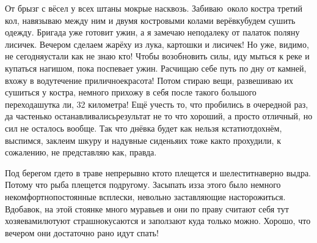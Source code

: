 От брызг с вёсел у всех штаны мокрые насквозь. Забиваю~около костра третий кол, навязываю между ним и двумя костровыми колами верёвку\mdash будем сушить одежду. Бригада уже готовит ужин, а я замечаю неподалеку от палаток поляну лисичек. Вечером сделаем жарёху из лука, картошки и лисичек! Но уже, видимо, не сегодня\mdash устали как не знаю кто! Чтобы возобновить силы, иду мыться к реке и купаться нагишом, пока поспевает ужин. Расчищаю себе путь по дну от камней, вхожу в воду\mdash течение приличное\mdash красота! Потом стираю вещи, развешиваю их сушиться у костра, немного прихожу в себя после такого большого перехода\mdash шутка ли, 32 километра! Ещё учесть то, что пробились в очередной раз, да частенько останавливались\mdash результат не то что хороший, а просто отличный, но сил не осталось вообще. Так что днёвка будет как нельзя кстати\mdash отдохнём, выспимся, заклеим шкуру и надувные сиденья\mdash их тоже как\sdash то прохудили, к сожалению, не представляю как, правда. 

Под берегом где\sdash то в траве непрерывно кто\sdash то плещется и шелестит\mdash наверно выдра. Потому что рыба плещется по\sdash другому. Засыпать из\sdash за этого было немного некомфортно\mdash постоянные всплески, невольно заставляющие насторожиться. Вдобавок, на этой стоянке много муравьев и они по праву считают себя тут хозяевами\mdash лютуют страшно\mdash кусаются и заползают куда только можно. Хорошо, что вечером они достаточно рано идут спать!

\begin{center}
\end{center}